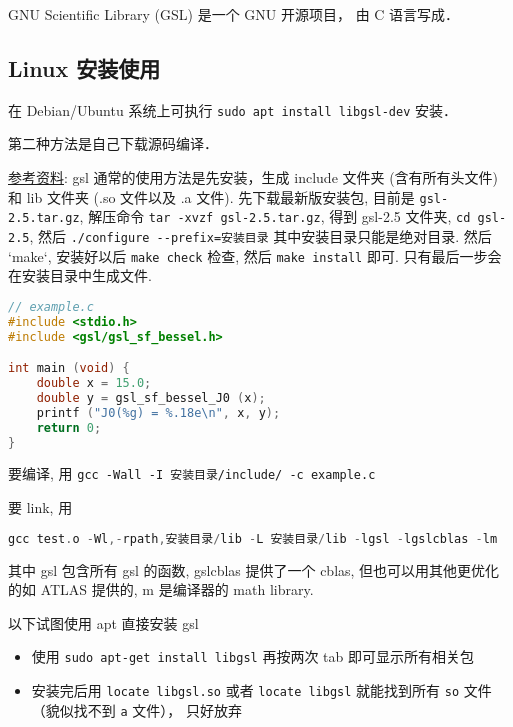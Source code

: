 
\begin{issues}
\issueDraft
\issueMissDepend
\end{issues}

GNU Scientific Library (GSL) 是一个 GNU 开源项目， 由 C 语言写成．

\subsection{Linux 安装使用}
在 Debian/Ubuntu 系统上可执行 \verb|sudo apt install libgsl-dev| 安装．

第二种方法是自己下载源码编译．

\href{https://coral.ise.lehigh.edu/jild13/2016/07/11/hello/}{参考资料}: gsl 通常的使用方法是先安装，生成 include 文件夹 (含有所有头文件) 和 lib 文件夹 (.so 文件以及 .a 文件). 先下载最新版安装包, 目前是 \verb`gsl-2.5.tar.gz`, 解压命令 \verb`tar -xvzf gsl-2.5.tar.gz`, 得到 gsl-2.5 文件夹, \verb`cd gsl-2.5`, 然后 \verb`./configure --prefix=安装目录` 其中安装目录只能是绝对目录. 然后 `make`, 安装好以后 \verb`make check` 检查, 然后 \verb`make install` 即可. 只有最后一步会在安装目录中生成文件.

\begin{lstlisting}[language=cpp]
// example.c
#include <stdio.h>
#include <gsl/gsl_sf_bessel.h>

int main (void) {
    double x = 15.0;
    double y = gsl_sf_bessel_J0 (x);
    printf ("J0(%g) = %.18e\n", x, y);
    return 0;
}
\end{lstlisting}

要编译, 用 \verb|gcc -Wall -I 安装目录/include/ -c example.c|

要 link, 用
\begin{lstlisting}[language=cpp]
gcc test.o -Wl,-rpath,安装目录/lib -L 安装目录/lib -lgsl -lgslcblas -lm
\end{lstlisting}
其中 gsl 包含所有 gsl 的函数, gslcblas 提供了一个 cblas, 但也可以用其他更优化的如 ATLAS 提供的, m 是编译器的 math library.

以下试图使用 apt 直接安装 gsl
\begin{itemize}
\item 使用 \verb`sudo apt-get install libgsl` 再按两次 tab 即可显示所有相关包
\item 安装完后用 \verb`locate libgsl.so` 或者 \verb`locate libgsl` 就能找到所有 \verb`so` 文件（貌似找不到 \verb`a` 文件）， 只好放弃
\end{itemize}


